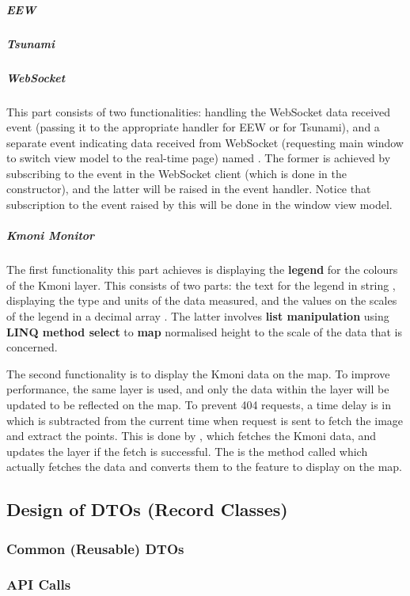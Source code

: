 \subparagraph{EEW}

\subparagraph{Tsunami}

\subparagraph{WebSocket}

This part consists of two functionalities: handling the WebSocket data received event (passing it to the appropriate handler for EEW or for Tsunami), and a separate event indicating data received from WebSocket (requesting main window to switch view model to the real-time page) named . The former is achieved by subscribing to the event in the WebSocket client (which is done in the constructor), and the latter will be raised in the event handler. Notice that subscription to the event raised by this will be done in the window view model.

\subparagraph{Kmoni Monitor}

The first functionality this part achieves is displaying the \textbf{legend} for the colours of the Kmoni layer. This consists of two parts: the text for the legend in string , displaying the type and units of the data measured, and the values on the scales of the legend in a decimal array . The latter involves \textbf{list manipulation} using \textbf{LINQ method select} to \textbf{map} normalised height to the scale of the data that is concerned.

The second functionality is to display the Kmoni data on the map. To improve performance, the same layer  is used, and only the data within the layer will be updated to be reflected on the map. To prevent 404 requests, a time delay is in  which is subtracted from the current time when request is sent to fetch the image and extract the points. This is done by , which fetches the Kmoni data, and updates the layer if the fetch is successful. The  is the method called which actually fetches the data and converts them to the feature to display on the map.

\subsection{Design of DTOs (Record Classes)}

\subsubsection{Common (Reusable) DTOs}

\subsubsection{API Calls}

